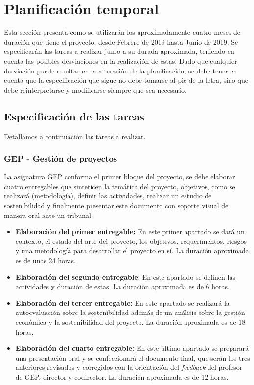 \section{Planificación temporal}
\label{sec:planificacion}

Esta sección presenta como se utilizarán los aproximadamente cuatro meses de duración que tiene el proyecto, desde Febrero de 2019 hasta Junio de 2019. Se especificarán las tareas a realizar junto a su durada aproximada, teniendo en cuenta las posibles desviaciones en la realización de estas. Dado que cualquier desviación puede resultar en la alteración de la planificación, se debe tener en cuenta que la especificación que sigue no debe tomarse al pie de la letra, sino que debe reinterpretarse y modificarse siempre que sea necesario. 

\subsection{Especificación de las tareas}

Detallamos a continuación las tareas a realizar.

\subsubsection{GEP - Gestión de proyectos}

La asignatura GEP conforma el primer bloque del proyecto, se debe elaborar cuatro entregables que sinteticen la temática del proyecto, objetivos, como se realizará (metodología), definir las actividades, realizar un estudio de sostenibilidad y finalmente presentar este documento con soporte visual de manera oral ante un tribunal.

\begin{itemize}
 \item \textbf{Elaboración del primer entregable:} En este primer apartado se dará un contexto, el estado del arte del proyecto, los objetivos, requerimentos, riesgos y una metodología para desarrollar el proyecto en sí. La duración aproximada es de unas 24 horas.
 \item \textbf{Elaboración del segundo entregable:} En este apartado se definen las actividades y duración de estas. La duración aproximada es de 6 horas.
 \item \textbf{Elaboración del tercer entregable:} En este apartado se realizará la autoevaluación sobre la sostenibilidad además de un análisis sobre la gestión económica y la sostenibilidad del proyecto. La duración aproximada es de 18 horas.
 \item \textbf{Elaboración del cuarto entregable:} En este último apartado se preparará una presentación oral y se confeccionará el documento final, que serán los tres anteriores revisados y corregidos con la orientación del \textit{feedback} del profesor de GEP, director y codirector. La duración aproximada es de 12 horas.
\end{itemize}


